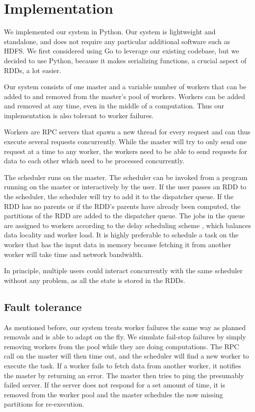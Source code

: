 \documentclass[10pt]{article}
\begin{document}
\section*{Implementation} We implemented our system in Python. Our system is
lightweight and standalone, and does not require any particular additional
software such as HDFS. We first considered using Go to leverage our existing codebase, but we decided to use Python, because it makes serializing functions, a crucial aspect of RDDs, a lot easier.

Our system consists of one master and a variable number of workers that can be
added to and removed from the master's pool of workers. Workers can be added and removed at any time, even in the middle of a computation. Thus our implementation is also tolerant to worker failures.

Workers are RPC servers that spawn a new thread for every request and can thus
execute several requests concurrently. While the master will try to only send
one request at a time to any worker, the workers need to be able to send
requests for data to each other which need to be processed concurrently.

The scheduler runs on the master. The scheduler can be invoked from a program running on the master or interactively by the user.  If the user passes an RDD to the scheduler, the scheduler will try to add it to the dispatcher queue. If the RDD has no parents or if the RDD's parents have already been computed, the partitions of the RDD are added to the dispatcher queue. The jobs in the queue are assigned to workers according to the delay scheduling scheme \cite{delay}, which balances data locality and worker load. It is highly preferable to schedule a task on the worker that has
the input data in memory because fetching it from another worker will take time
and network bandwidth.

In principle, multiple users could interact concurrently with the same
scheduler without any problem, as all the state is stored in the RDDs.

\subsection*{Fault tolerance}
As mentioned before, our system treats worker failures the same way as planned removals and is able to adapt on the fly. We simulate fail-stop failures by simply removing workers from the pool while they are doing computations. The RPC call on the master will then time out, and the scheduler will find a new worker to execute the task. If a worker fails to fetch data from another worker, it notifies the master by returning an error. The master then tries to ping the presumably failed server. If the server does not respond for a set amount of time, it is removed from the worker pool and the master schedules the now missing partitions for re-execution.
\end{document}
